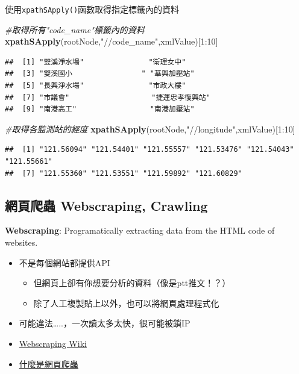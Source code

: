 \documentclass[]{book}
\newenvironment{Shaded}{\begin{snugshade}}{\end{snugshade}}
\newcommand{\KeywordTok}[1]{\textcolor[rgb]{0.13,0.29,0.53}{\textbf{{#1}}}}
\newcommand{\DecValTok}[1]{\textcolor[rgb]{0.00,0.00,0.81}{{#1}}}
\newcommand{\StringTok}[1]{\textcolor[rgb]{0.31,0.60,0.02}{{#1}}}
\newcommand{\CommentTok}[1]{\textcolor[rgb]{0.56,0.35,0.01}{\textit{{#1}}}}
\newcommand{\NormalTok}[1]{{#1}}
\providecommand{\tightlist}{%
  \setlength{\itemsep}{0pt}\setlength{\parskip}{0pt}}
\theoremstyle{definition}
\theoremstyle{definition}
\theoremstyle{remark}
\begin{document}
使用\texttt{xpathSApply()}函數取得指定標籤內的資料

\begin{Shaded}
\begin{Highlighting}[]
\CommentTok{#取得所有"code_name"標籤內的資料}
\KeywordTok{xpathSApply}\NormalTok{(rootNode,}\StringTok{"//code_name"}\NormalTok{,xmlValue)[}\DecValTok{1}\NormalTok{:}\DecValTok{10}\NormalTok{]}
\end{Highlighting}
\end{Shaded}

\begin{verbatim}
##  [1] "雙溪淨水場"               "衛理女中"                
##  [3] "雙溪國小                " "華興加壓站"              
##  [5] "長興淨水場"               "市政大樓"                
##  [7] "市議會"                   "捷運忠孝復興站"          
##  [9] "南港高工"                 "南港加壓站"
\end{verbatim}

\begin{Shaded}
\begin{Highlighting}[]
\CommentTok{#取得各監測站的經度}
\KeywordTok{xpathSApply}\NormalTok{(rootNode,}\StringTok{"//longitude"}\NormalTok{,xmlValue)[}\DecValTok{1}\NormalTok{:}\DecValTok{10}\NormalTok{]}
\end{Highlighting}
\end{Shaded}

\begin{verbatim}
##  [1] "121.56094" "121.54401" "121.55557" "121.53476" "121.54043" "121.55661"
##  [7] "121.55360" "121.53551" "121.59892" "121.60829"
\end{verbatim}

\subsection{網頁爬蟲 Webscraping, Crawling}\label{-webscraping-crawling}

\textbf{Webscraping}: Programatically extracting data from the HTML code
of websites.

\begin{itemize}
\tightlist
\item
  不是每個網站都提供API

  \begin{itemize}
  \tightlist
  \item
    但網頁上卻有你想要分析的資料（像是ptt推文！？）
  \item
    除了人工複製貼上以外，也可以將網頁處理程式化
  \end{itemize}
\item
  可能違法\ldots{}..，一次讀太多太快，很可能被鎖IP
\item
  \href{http://en.wikipedia.org/wiki/Web_scraping}{Webscraping Wiki}
\item
  \href{http://www.largitdata.com/course/1/}{什麼是網頁爬蟲}
\end{itemize}
\end{document}
